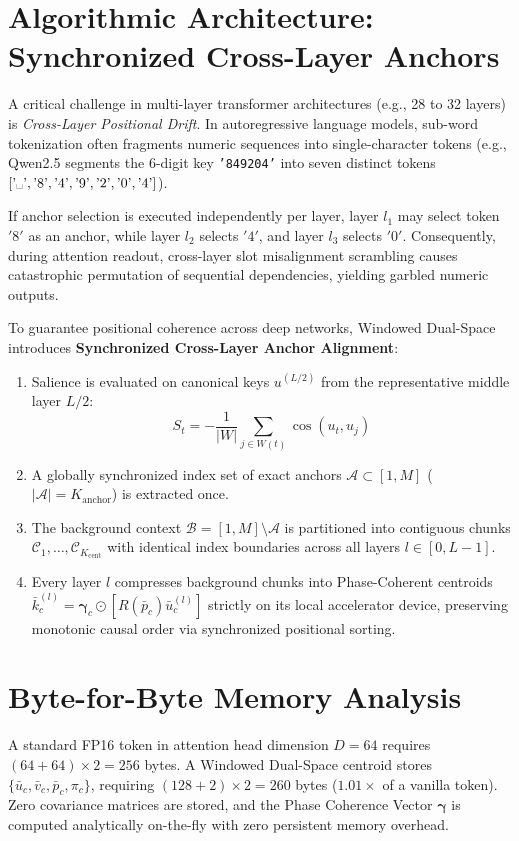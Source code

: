 \documentclass[11pt,a4paper]{article}
\begin{document}
\section{Algorithmic Architecture: Synchronized Cross-Layer Anchors}

A critical challenge in multi-layer transformer architectures (e.g., 28 to 32 layers) is \textit{Cross-Layer Positional Drift}. In autoregressive language models, sub-word tokenization often fragments numeric sequences into single-character tokens (e.g., Qwen2.5 segments the 6-digit key \texttt{'849204'} into seven distinct tokens $[\text{'\textvisiblespace'}, \text{'8'}, \text{'4'}, \text{'9'}, \text{'2'}, \text{'0'}, \text{'4'}]$).

If anchor selection is executed independently per layer, layer $l_1$ may select token $'8'$ as an anchor, while layer $l_2$ selects $'4'$, and layer $l_3$ selects $'0'$. Consequently, during attention readout, cross-layer slot misalignment scrambling causes catastrophic permutation of sequential dependencies, yielding garbled numeric outputs.

To guarantee positional coherence across deep networks, Windowed Dual-Space introduces \textbf{Synchronized Cross-Layer Anchor Alignment}:
\begin{enumerate}
    \item Salience is evaluated on canonical keys $u^{(L/2)}$ from the representative middle layer $L/2$:
    \begin{equation}
        S_t = - \frac{1}{|W|}\sum_{j \in W(t)} \cos(u_t, u_j)
    \end{equation}
    \item A globally synchronized index set of exact anchors $\mathcal{A} \subset [1, M]$ ($|\mathcal{A}| = K_{\text{anchor}}$) is extracted once.
    \item The background context $\mathcal{B} = [1, M] \setminus \mathcal{A}$ is partitioned into contiguous chunks $\mathcal{C}_1, \dots, \mathcal{C}_{K_{\text{cent}}}$ with identical index boundaries across all layers $l \in [0, L-1]$.
    \item Every layer $l$ compresses background chunks into Phase-Coherent centroids $\bar{k}_c^{(l)} = \boldsymbol{\gamma}_c \odot [R(\bar{p}_c) \bar{u}_c^{(l)}]$ strictly on its local accelerator device, preserving monotonic causal order via synchronized positional sorting.
\end{enumerate}

\section{Byte-for-Byte Memory Analysis}
A standard FP16 token in attention head dimension $D=64$ requires $(64 + 64) \times 2 = 256$ bytes.
A Windowed Dual-Space centroid stores $\{\bar{u}_c, \bar{v}_c, \bar{p}_c, \pi_c\}$, requiring $(128 + 2) \times 2 = 260$ bytes ($1.01\times$ of a vanilla token).
Zero covariance matrices are stored, and the Phase Coherence Vector $\boldsymbol{\gamma}$ is computed analytically on-the-fly with zero persistent memory overhead.
\end{document}
